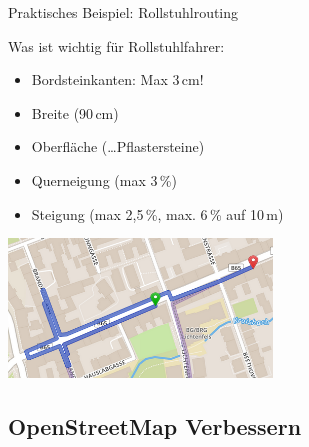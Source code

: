 \documentclass{beamer}
\begin{document}
\begin{frame}{Praktisches Beispiel: Rollstuhlrouting}

Was ist wichtig für Rollstuhlfahrer:

\begin{itemize}
  \item Bordsteinkanten: Max 3\,cm!
  \item Breite (90\,cm)
  \item Oberfläche (\dots Pflastersteine)
  \item Querneigung (max 3\,\%)
  \item Steigung (max 2,5\,\%, max. 6\,\% auf 10\,m)
\end{itemize}

\includegraphics[width=7cm]{rolliroute.png}

\end{frame}


  \subsection{ OpenStreetMap Verbessern}
\end{document}
